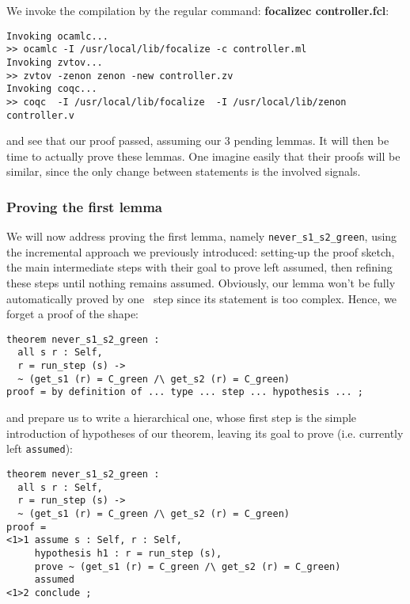 {\scriptsize
}

We invoke the compilation by the regular command:
\textbf{focalizec controller.fcl}:

{\scriptsize
\begin{verbatim}
Invoking ocamlc...
>> ocamlc -I /usr/local/lib/focalize -c controller.ml
Invoking zvtov...
>> zvtov -zenon zenon -new controller.zv
Invoking coqc...                                                
>> coqc  -I /usr/local/lib/focalize  -I /usr/local/lib/zenon controller.v
\end{verbatim}}

\noindent and see that our proof passed, assuming our 3 pending
lemmas. It will then be time to actually prove these lemmas. One
imagine easily that their proofs will be similar, since the only
change between statements is the involved signals.


\subsubsection{Proving the first lemma}
We will now address proving the first lemma, namely
\lstinline"never_s1_s2_green", using the incremental approach we
previously introduced: setting-up the proof sketch, the main
intermediate steps with their goal to prove left assumed, then
refining these steps until nothing remains assumed. Obviously, our
lemma won't be fully automatically proved by one \zenon\ step since
its statement is too complex. Hence, we forget a proof of the shape:

{\scriptsize
\begin{lstlisting}
theorem never_s1_s2_green :
  all s r : Self,
  r = run_step (s) ->
  ~ (get_s1 (r) = C_green /\ get_s2 (r) = C_green)
proof = by definition of ... type ... step ... hypothesis ... ;
\end{lstlisting}}

\noindent and prepare us to write a hierarchical one, whose first step is
the simple introduction of hypotheses of our theorem, leaving its goal
to prove (i.e. currently left \lstinline"assumed"):

{\scriptsize
\begin{lstlisting}
theorem never_s1_s2_green :
  all s r : Self,
  r = run_step (s) ->
  ~ (get_s1 (r) = C_green /\ get_s2 (r) = C_green)
proof =
<1>1 assume s : Self, r : Self,
     hypothesis h1 : r = run_step (s),
     prove ~ (get_s1 (r) = C_green /\ get_s2 (r) = C_green)
     assumed
<1>2 conclude ;
\end{lstlisting}}

